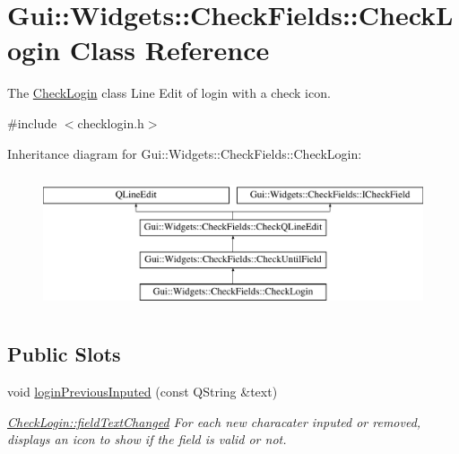 \hypertarget{classGui_1_1Widgets_1_1CheckFields_1_1CheckLogin}{\section{Gui\-:\-:Widgets\-:\-:Check\-Fields\-:\-:Check\-Login Class Reference}
\label{classGui_1_1Widgets_1_1CheckFields_1_1CheckLogin}
}


The \hyperlink{classGui_1_1Widgets_1_1CheckFields_1_1CheckLogin}{Check\-Login} class Line Edit of login with a check icon.  




{\ttfamily \#include $<$checklogin.\-h$>$}

Inheritance diagram for Gui\-:\-:Widgets\-:\-:Check\-Fields\-:\-:Check\-Login\-:\begin{figure}[H]
\begin{center}
\leavevmode
\includegraphics[height=4.000000cm]{dd/dfe/classGui_1_1Widgets_1_1CheckFields_1_1CheckLogin}
\end{center}
\end{figure}
\subsection*{Public Slots}
\begin{DoxyCompactItemize}
\item 
\hypertarget{classGui_1_1Widgets_1_1CheckFields_1_1CheckLogin_a8ae000bc2a74fe70ec6790737e764740}{void \hyperlink{classGui_1_1Widgets_1_1CheckFields_1_1CheckLogin_a8ae000bc2a74fe70ec6790737e764740}{login\-Previous\-Inputed} (const Q\-String \&text)}\label{classGui_1_1Widgets_1_1CheckFields_1_1CheckLogin_a8ae000bc2a74fe70ec6790737e764740}

\begin{DoxyCompactList}\small\item\em \hyperlink{classGui_1_1Widgets_1_1CheckFields_1_1CheckQLineEdit_ad297d518964bd170e8cc7533795ff99e}{Check\-Login\-::field\-Text\-Changed} For each new characater inputed or removed, displays an icon to show if the field is valid or not. \end{DoxyCompactList}\end{DoxyCompactItemize}
